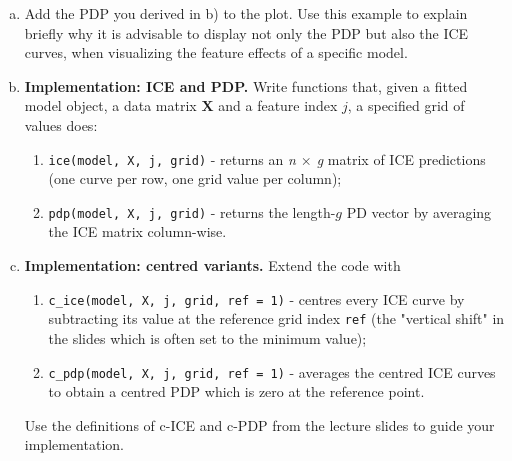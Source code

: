 {\begin{enumerate}[a)]
  \item Add the PDP you derived in b) to the plot. 
  Use this example to explain briefly why it is advisable to display not only the PDP but also the ICE curves, 
  when visualizing the feature effects of a specific model. 
  
  \item \textbf{Implementation: ICE and PDP.}  
        Write functions that, given a fitted model object, a data matrix \(\mathbf X\) and a feature index \(j\), a specified grid of values does:

        \begin{enumerate}[1.]
          \item \verb|ice(model, X, j, grid)| - returns an \emph{n $\times$ g} matrix of ICE predictions  
                (one curve per row, one grid value per column);
          \item \verb|pdp(model, X, j, grid)| - returns the length-\(g\) PD vector  
                by averaging the ICE matrix column-wise.
        \end{enumerate}

  \item \textbf{Implementation: centred variants.}  
        Extend the code with

        \begin{enumerate}[1.]
          \item \verb|c_ice(model, X, j, grid, ref = 1)| - centres every ICE curve by subtracting its value  
                at the reference grid index \verb|ref| (the "vertical shift" in the slides which is often set to the minimum value);
          \item \verb|c_pdp(model, X, j, grid, ref = 1)| - averages the centred ICE curves to obtain a centred PDP  
                which is zero at the reference point.
        \end{enumerate}

        Use the definitions of c-ICE and c-PDP from the lecture slides to guide your implementation.  

\end{enumerate}
}
